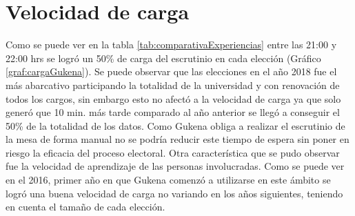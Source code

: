 \section{Velocidad de carga}
Como se puede ver en la tabla \ref{tab:comparativaExperiencias} entre las 21:00 y 22:00 hrs se logró un 50\% de carga del escrutinio  en cada elección (Gráfico \ref{graf:cargaGukena}). Se puede observar que las elecciones en el año 2018 fue el más abarcativo participando la totalidad de la universidad y con renovación de todos los cargos, sin embargo esto no afectó a la velocidad de carga ya que solo generó que 10 min. más tarde comparado al año anterior se llegó a conseguir el 50\% de la totalidad de los datos. Como Gukena obliga a realizar el escrutinio de la mesa de forma manual no se podría reducir este tiempo de espera sin poner en riesgo la eficacia del proceso electoral. Otra característica que se pudo observar fue la velocidad de aprendizaje de las personas involucradas. Como se puede ver en el 2016, primer año en que Gukena comenzó a utilizarse en este ámbito se logró una buena velocidad de carga no variando en los años siguientes, teniendo en cuenta el tamaño de cada elección.


